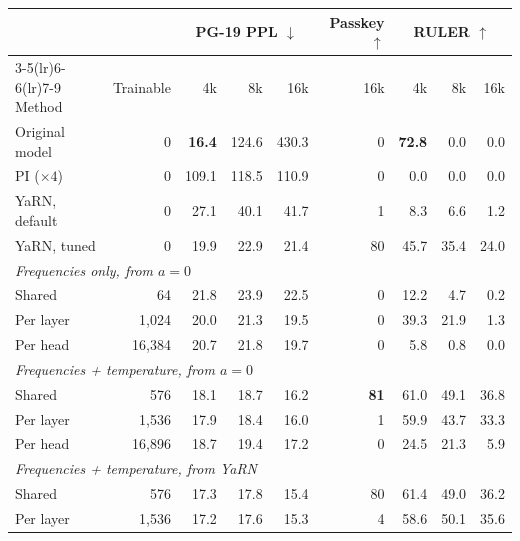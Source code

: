 
\begin{table}[t]
\centering
\small
\begin{tabular}{l r rrr r rrr}
\toprule
& & \multicolumn{3}{c}{PG-19 PPL $\downarrow$} & Passkey $\uparrow$ & \multicolumn{3}{c}{RULER $\uparrow$} \\
\cmidrule(lr){3-5}\cmidrule(lr){6-6}\cmidrule(lr){7-9}
Method & Trainable & 4k & 8k & 16k & 16k & 4k & 8k & 16k \\
\midrule
Original model    & 0 & \textbf{16.4} & 124.6 & 430.3 & 0 & \textbf{72.8} & 0.0 & 0.0 \\
PI ($\times 4$)   & 0 & 109.1 & 118.5 & 110.9 & 0 & 0.0 & 0.0 & 0.0 \\
YaRN, default     & 0 & 27.1 & 40.1 & 41.7 & 1 & 8.3 & 6.6 & 1.2 \\
YaRN, tuned       & 0 & 19.9 & 22.9 & 21.4 & 80 & 45.7 & 35.4 & 24.0 \\
\midrule
\multicolumn{9}{l}{\textit{Frequencies only, from $a{=}0$}} \\
\quad Shared      & 64     & 21.8 & 23.9 & 22.5 & 0 & 12.2 & 4.7 & 0.2 \\
\quad Per layer   & 1,024  & 20.0 & 21.3 & 19.5 & 0 & 39.3 & 21.9 & 1.3 \\
\quad Per head    & 16,384 & 20.7 & 21.8 & 19.7 & 0 & 5.8 & 0.8 & 0.0 \\
\multicolumn{9}{l}{\textit{Frequencies + temperature, from $a{=}0$}} \\
\quad Shared      & 576    & 18.1 & 18.7 & 16.2 & \textbf{81} & 61.0 & 49.1 & 36.8 \\
\quad Per layer   & 1,536  & 17.9 & 18.4 & 16.0 & 1 & 59.9 & 43.7 & 33.3 \\
\quad Per head    & 16,896 & 18.7 & 19.4 & 17.2 & 0 & 24.5 & 21.3 & 5.9 \\
\multicolumn{9}{l}{\textit{Frequencies + temperature, from YaRN}} \\
\quad Shared      & 576    & 17.3 & 17.8 & 15.4 & 80 & 61.4 & 49.0 & 36.2 \\
\quad Per layer   & 1,536  & 17.2 & 17.6 & 15.3 & 4 & 58.6 & 50.1 & 35.6 \\

\end{tabular}
\end{table}
